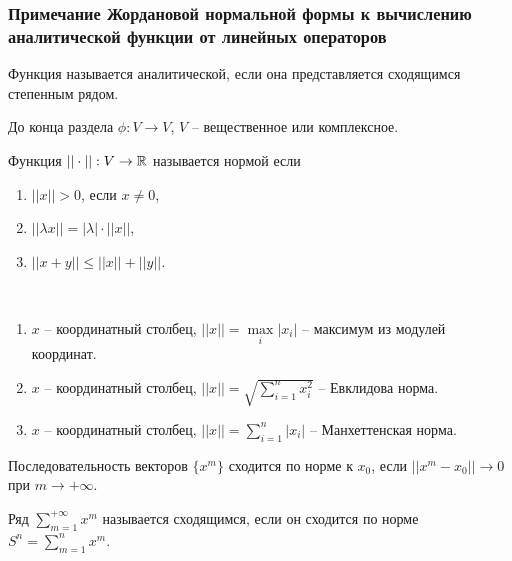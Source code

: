 \subsubsection{Примечание Жордановой нормальной формы к вычислению аналитической функции от линейных операторов}

\begin{definition}
    Функция называется аналитической, если она представляется сходящимся степенным рядом.
\end{definition}

\begin{agreement}
    До конца раздела $\phi: V \to V$, $V$ -- вещественное или комплексное.
\end{agreement}

\begin{definition}
    Функция $||\cdot||: V \to \mathbb{R}$ называется нормой если 
    \begin{enumerate}
        \item $||x|| > 0$, если $x \neq 0$,
        \item $|| \lambda x|| = |\lambda| \cdot ||x||$,
        \item $||x + y|| \leq ||x|| + ||y||$.
    \end{enumerate}
\end{definition}

\begin{example}~
    \begin{enumerate}
        \item $x$ -- координатный столбец, 
            $||x|| = \underset{i}{\max} |x_i|$ -- максимум из модулей координат.
        \item $x$ -- координатный столбец, $||x|| = \sqrt{\displaystyle\sum_{i=1}^{n}x_i^2}$ 
            -- Евклидова норма.
        \item $x$ -- координатный столбец, $||x|| = \displaystyle\sum_{i=1}^{n}|x_i|$ 
            -- Манхеттенская норма.
    \end{enumerate}
\end{example}

\begin{definition}
    Последовательность векторов $\{x^m\}$ сходится по норме к $x_0$, 
    если $||x^m - x_0|| \to 0$ при $m \to +\infty$.
\end{definition}

\begin{definition}
    Ряд $\displaystyle\sum_{m=1}^{+\infty} x^m$ называется сходящимся, если он сходится по норме 
    $S^n = \displaystyle\sum_{m=1}^{n}x^m$.
\end{definition}

